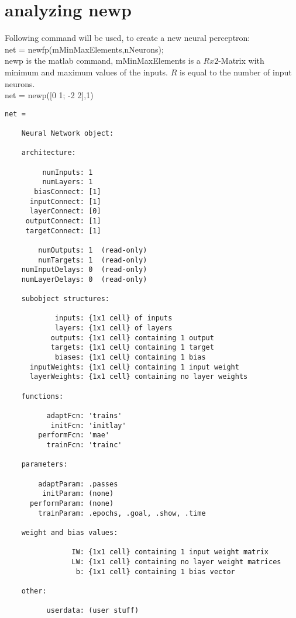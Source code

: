 \section{analyzing newp}


Following command will be used, to create a new neural perceptron:\\
\noindent net = newfp(mMinMaxElements,nNeurons);\\

newp is the matlab command, mMinMaxElements is a $Rx2$-Matrix with minimum and maximum values of the inputs. $R$ is equal to the number of input neurons. \\

net = newp([0 1; -2 2],1)

\begin{verbatim}
net =

    Neural Network object:

    architecture:

         numInputs: 1
         numLayers: 1
       biasConnect: [1]
      inputConnect: [1]
      layerConnect: [0]
     outputConnect: [1]
     targetConnect: [1]

        numOutputs: 1  (read-only)
        numTargets: 1  (read-only)
    numInputDelays: 0  (read-only)
    numLayerDelays: 0  (read-only)

    subobject structures:

            inputs: {1x1 cell} of inputs
            layers: {1x1 cell} of layers
           outputs: {1x1 cell} containing 1 output
           targets: {1x1 cell} containing 1 target
            biases: {1x1 cell} containing 1 bias
      inputWeights: {1x1 cell} containing 1 input weight
      layerWeights: {1x1 cell} containing no layer weights

    functions:

          adaptFcn: 'trains'
           initFcn: 'initlay'
        performFcn: 'mae'
          trainFcn: 'trainc'

    parameters:

        adaptParam: .passes
         initParam: (none)
      performParam: (none)
        trainParam: .epochs, .goal, .show, .time

    weight and bias values:

                IW: {1x1 cell} containing 1 input weight matrix
                LW: {1x1 cell} containing no layer weight matrices
                 b: {1x1 cell} containing 1 bias vector

    other:

          userdata: (user stuff)
\end{verbatim}
